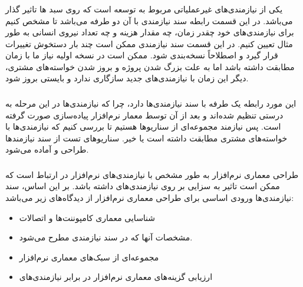 \subsubsection{}

یکی از نیازمندی‌های غیرعملیاتی مربوط به توسعه است که روی سبد ها تاثیر
گذار می‌باشد. در این قسمت رابطه سند نیازمندی با آن دو طرفه می‌باشد تا مشخص کنیم
برای نیازمندی‌های خود چقدر زمان، چه مقدار هزینه و چه تعداد نیروی انسانی به طور
مثال تعیین کنیم. در این قسمت سند نیازمندی ممکن است چند بار دستخوش تغییرات قرار
گیرد و اصطلاحاً نسخه‌بندی شود. ممکن است در نسخه اولیه نیاز ما با زمان مطابقت
داشته باشد اما به علت بزرگ شدن پروژه و بروز شدن خواسته‌های مشتری، دیگر این زمان
با نیازمندی‌های جدید سازگاری ندارد و بایستی بروز شود.

\subsubsection{}

این مورد رابطه یک طرفه با سند نیازمندی‌ها دارد، چرا که نیازمندی‌ها در این مرحله
به درستی تنظیم شده‌اند و بعد از آن توسط معمار نرم‌افزار پیاده‌سازی صورت گرفته
است. پس نیازمند مجموعه‌ای از سناریو‌ها هستیم تا بررسی کنیم که نیازمندی‌ها با
خواسته‌های مشتری مطابقت داشته است یا خیر. سناریو‌های تست از سند نیازمند‌ها طراحی
و آماده می‌شود.

\subsubsection{}

طراحی معماری نرم‌افزار به طور مشخص با نیازمندی‌های نرم‌افزار در ارتباط است که
ممکن است تاثیر به سزایی بر روی نیازمندی‌های  داشته باشد. بر
این اساس، سند نیازمندی‌ها ورودی اساسی برای طراحی معماری نرم‌افزار از دیدگاه‌های
زیر می‌باشد:

\begin{itemize}
    \item شناسایی معماری کامپوننت‌ها و اتصالات
    \item مشخصات آنها که در سند نیازمندی مطرح می‌شود.
    \item مجموعه‌ای از سبک‌های معماری نرم‌افزار
    \item ارزیابی گزینه‌های معماری نرم‌افزار در برابر نیازمندی‌های 
\end{itemize}

\subsubsection{}

